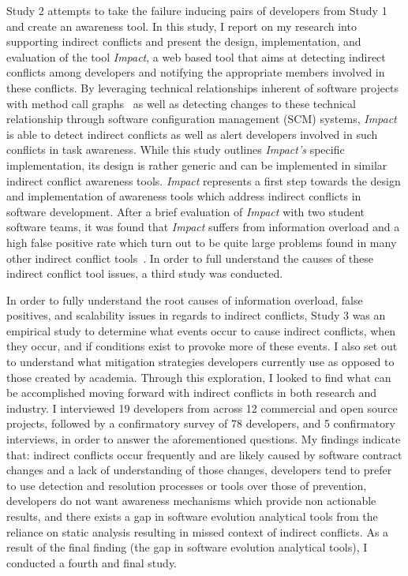 Study 2 attempts to take the failure inducing pairs of developers from Study 1 and create an awareness tool.
In this study, I report on my research into supporting indirect conflicts and present the design, implementation, and 
evaluation of the tool \textit{Impact}, a web based tool that aims at detecting indirect conflicts among developers and 
notifying the appropriate members involved in these conflicts. By leveraging technical relationships inherent of software 
projects with method call graphs~\cite{Lakhotia:1993:CCM} as well as detecting changes to these technical relationship 
through software configuration management (SCM) systems, \textit{Impact} is able to detect indirect conflicts as well as 
alert developers involved in such conflicts in task awareness. While this study outlines \textit{Impact's} specific 
implementation, its design is rather generic and can be implemented in similar indirect conflict awareness tools. 
\textit{Impact} represents a first step towards the design and implementation of awareness tools which address indirect 
conflicts in software development. After a brief evaluation of \textit{Impact} with two student software teams, it was
found that \textit{Impact} suffers from information overload and a high false positive rate which turn out to be quite
large problems found in many other indirect conflict
tools~\cite{Sarma:2007:TSA, Holmes:2010:CAR, Trainer:2005:BGT, Servant:2010:CPI, Borici:2012:CHA}. In order to full understand 
the causes of these indirect conflict tool issues, a third study was conducted.


In order to fully understand the root causes of information overload, false positives, and
scalability issues in regards to indirect conflicts, Study 3 was an empirical study to determine what events occur to
cause indirect conflicts, when they occur, and if conditions exist to provoke more of these events. 
I also set out to understand what mitigation strategies developers currently use as opposed to those created
by academia. Through this exploration, I looked to find what can be accomplished moving forward with indirect conflicts
in both research and industry. I interviewed 19 developers from across 12 commercial and open source projects, followed by a confirmatory survey of 78 
developers, and 5 confirmatory interviews, in order to answer the aforementioned questions. My findings indicate that: 
indirect conflicts occur frequently and are likely caused by software contract changes and a lack of understanding of those changes,
developers tend to prefer to use detection and resolution processes or tools
over those of prevention, developers do not want awareness mechanisms which provide non actionable results, 
and there exists a gap in software evolution analytical tools from the reliance on static analysis resulting in missed
context of indirect conflicts. As a result of the final finding (the gap in software evolution analytical tools), I conducted
a fourth and final study.

